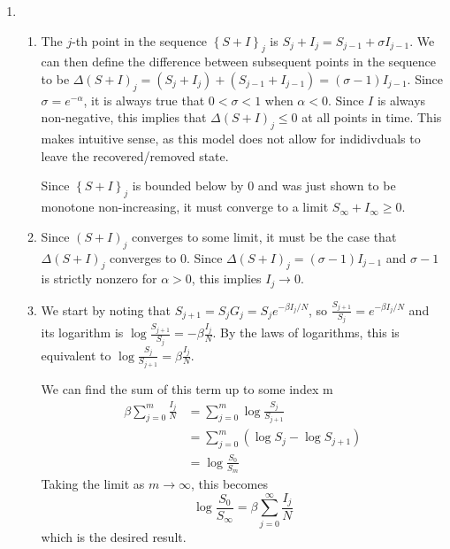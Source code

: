 \documentclass{article}
\begin{document}
\begin{enumerate}
	\item
		\begin{enumerate}
			\item The $j$-th point in the sequence $\left\{ S+I \right\}_j$ is $S_j + I_j = S_{j-1} + \sigma I_{j-1}$. We can then define the difference between subsequent points in the sequence to be $\Delta (S+I)_j = (S_j + I_j) + (S_{j-1} + I_{j-1}) = (\sigma -1) I_{j-1}$. Since $\sigma = e^{-\alpha}$, it is always true that $0 < \sigma < 1$ when $\alpha < 0$. Since $I$ is always non-negative, this implies that $\Delta(S+I)_j \leq 0$ at all points in time. This makes intuitive sense, as this model does not allow for indidivduals to leave the recovered/removed state.

			Since $\left\{ S+I \right\}_j$ is bounded below by 0 and was just shown to be monotone non-increasing, it must converge to a limit $S_\infty+I_\infty \geq 0$.

		\item Since $(S+I)_j$ converges to some limit, it must be the case that $\Delta (S+I)_j$ converges to 0. Since $\Delta (S+I)_j = (\sigma - 1) I_{j-1}$ and $\sigma - 1$ is strictly nonzero for $\alpha>0$, this implies $I_j \to 0$.

			\item We start by noting that $S_{j+1} = S_j G_j = S_j e^{-\beta I_j/N}$, so $\frac{S_{j+1}}{S_j} = e^{-\beta I_j/N}$ and its logarithm is $\log \frac{S_{j+1}}{S_j} = -\beta \frac{I_j}{N}$. By the laws of logarithms, this is equivalent to $\log \frac{S_j}{S_{j+1}} = \beta \frac{I_j}{N}$.

			We can find the sum of this term up to some index m
			\begin{align*}
				\beta \sum_{j=0}^m \frac{I_j}{N} &= \sum_{j=0}^m \log \frac{S_j}{S_{j+1}} \\
								 &= \sum_{j=0}^m \left( \log S_j - \log S_{j+1} \right) \\
								 &= \log \frac{S_0}{S_m}
			\end{align*}
			Taking the limit as $m\to\infty$, this becomes
			\[
			\log \frac{S_0}{S_\infty} = \beta \sum_{j=0}^\infty \frac{I_j}{N}
			\] 
			which is the desired result.


\end{enumerate}
\end{enumerate}
\end{document}
